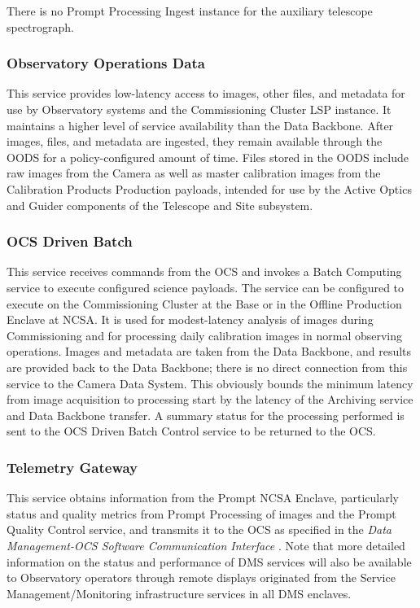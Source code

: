 \documentclass[DM,toc,lsstdraft]{lsstdoc}
\begin{document}
There is no Prompt Processing Ingest instance for the auxiliary
telescope spectrograph.

\subsubsection{Observatory Operations Data}\label{obs-ops-data}

This service provides low-latency access to images, other files, and metadata for use by Observatory systems and the Commissioning Cluster LSP instance.
It maintains a higher level of service availability than the Data Backbone.
After images, files, and metadata are ingested, they remain available through the OODS for a policy-configured amount of time.
Files stored in the OODS include raw images from the Camera as well as master calibration images from the Calibration Products Production payloads, intended for use by the Active Optics and Guider components of the Telescope and Site subsystem.

\subsubsection{OCS Driven Batch}\label{ocs-driven-batch}

This service receives commands from the OCS and invokes a Batch Computing service to execute configured science payloads.
The service can be configured to execute on the Commissioning Cluster at the Base or in the Offline Production Enclave at NCSA.
It is used for modest-latency analysis of images during Commissioning and for processing daily calibration images in normal observing operations.
Images and metadata are taken from the Data Backbone, and results are provided back to the Data Backbone; there is no direct connection from this service to the Camera Data System.
This obviously bounds the minimum latency from image acquisition to processing start by the latency of the Archiving service and Data Backbone transfer.
A summary status for the processing performed is sent to the OCS Driven Batch Control service to be returned to the OCS.

\subsubsection{Telemetry Gateway}\label{telemetry-gateway}

This service obtains information from the Prompt NCSA Enclave,
particularly status and quality metrics from Prompt Processing of images
and the Prompt Quality Control service, and transmits it to the OCS as
specified in the \textit{Data Management-OCS Software Communication Interface}
. Note that more detailed information on the status and
performance of DMS services will also be available to Observatory
operators through remote displays originated from the
Service Management/Monitoring infrastructure services in all DMS enclaves.
\end{document}
